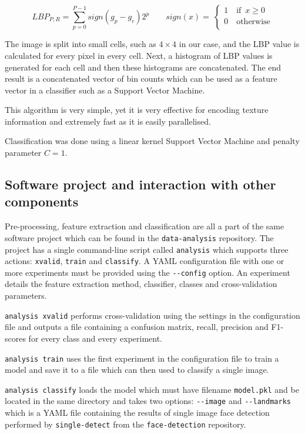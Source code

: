\begin{equation}
\label{eq:spec:features:lbp}
LBP_{P,R} = \sum_{p=0}^{P-1} sign(g_p - g_c)2^p  \qquad sign(x) = \
\begin{cases}
    1 \quad \text{if} \enspace x \geq 0 \\
    0 \quad \text{otherwise} \\
\end{cases}
\end{equation}

The image is split into small cells, such as $4 \times 4$ in our case, and the
LBP value is calculated for every pixel in every cell. Next, a histogram of LBP
values is generated for each cell and then these histograms are concatenated.
The end result is a concatenated vector of bin counts which can be used as a
feature vector in a classifier such as a Support Vector Machine.

This algorithm is very simple, yet it is very effective for encoding texture
information and extremely fast as it is easily parallelised.

Classification was done using a linear kernel Support Vector Machine and
penalty parameter $C = 1$.

\subsection{Software project and interaction with other components}
\label{spec:analysis:software}
Pre-processing, feature extraction and classification are all a part of the
same software project which can be found in the \texttt{data-analysis}
repository. The project has a single command-line script called
\texttt{analysis} which supports three actions: \texttt{xvalid}, \texttt{train}
and \texttt{classify}. A YAML configuration file with one or more experiments must
be provided using the \texttt{-{}-config} option. An experiment details the
feature extraction method, classifier, classes and cross-validation parameters.

\texttt{analysis xvalid} performs cross-validation using the settings in the
configuration file and outputs a file containing a confusion matrix, recall,
precision and F1-scores for every class and every experiment.

\texttt{analysis train} uses the first experiment in the configuration file to
train a model and save it to a file which can then used to classify a single
image.

\texttt{analysis classify} loads the model which must have filename
\texttt{model.pkl} and be located in the same directory and takes two options:
\texttt{-{}-image} and \texttt{-{}-landmarks} which is a YAML file containing
the results of single image face detection performed by \texttt{single-detect}
from the \texttt{face-detection} repository.

